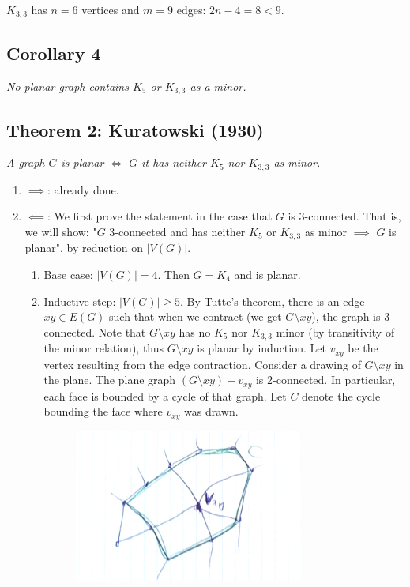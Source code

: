 		$K_{3,3}$ has $n = 6$ vertices and $m = 9$ edges: $2n - 4 = 8 < 9$.
		
		\subsection{Corollary 4}
		\textit{No planar graph contains $K_5$ or $K_{3,3}$ as a minor.}
		
		\subsection{Theorem 2: Kuratowski (1930)}
		\textit{A graph $G$ is planar $\iff$ $G$ it has neither $K_5$ nor $K_{3,3}$ as minor.\\}
		
		\begin{enumerate}
			\item $\implies$: already done.
			\item $\impliedby$: We first prove the statement in the case that $G$ is 3-connected. That is, we will show: "$G$ 3-connected and has neither $K_5$ or $K_{3,3}$ as minor $\implies$ $G$ is planar", by reduction on $|V(G)|$.
				\begin{enumerate}
					\item Base case: $|V(G)| = 4$. Then $G = K_4$ and is planar.
					\item Inductive step: $|V(G)| \geq 5$. By Tutte's theorem, there is an edge $xy \in E(G)$ such that when we contract (we get $G \setminus xy$), the graph is 3-connected. Note that $G \setminus xy$ has no $K_5$ nor $K_{3,3}$ minor (by transitivity of the minor relation), thus $G \setminus xy$ is planar by induction. Let $v_{xy}$ be the vertex resulting from the edge contraction. Consider a drawing of $G \setminus xy$ in the plane. The plane graph $(G \setminus xy) - v_{xy}$ is 2-connected. In particular, each face is bounded by a cycle of that graph. Let $C$ denote the cycle bounding the face where $v_{xy}$ was drawn.
\begin{figure}[H]
	\center
	\includegraphics[height=5cm]{img/4-1.png}
\end{figure}


\end{enumerate}
\end{enumerate}
